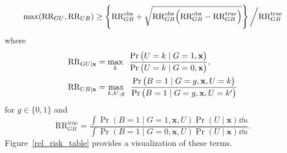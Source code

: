 \documentclass[aoas,preprint, 11pt, dvipsnames, table, x11name]{imsart}
\renewcommand{\bm}[1]{\mathbf{#1}}
\theoremstyle{remark}
\begin{document}
	\begin{equation}
		\max(\text{RR}_{GU}, \text{RR}_{UB})\geq \cbr{\text{RR}^{\text{obs}}_{GB}+\sqrt{\text{RR}^{\text{obs}}_{GB}\qty(\text{RR}^{\text{obs}}_{GB}-\text{RR}^{\text{true}}_{GB})}}\bigg{/}\text{RR}^{\text{true}}_{GB}
		\label{high_thresh}
	\end{equation}
	where
	\begin{align*}
		\text{RR}_{GU\mid \bm{x}} &= \max_{k} \;\;  \frac{\Pr\qty(U=k\mid G=1, \bm{x})}{\Pr\qty(U=k\mid G=0, \bm{x})},\\
		\text{RR}_{UB\mid \bm{x}} &= \max_{k,k',g} \;\; \frac{\Pr\qty(B=1\mid G=g, \bm{x}, U=k)}{\Pr\qty(B=1\mid G=g, \bm{x}, U=k')} 
	\end{align*}
	for $g \in \lbrace 0,1\rbrace$ and
	\begin{equation}
		\text{RR}^{\text{true}}_{GB}=\frac{\int \Pr(B=1\mid G=1, \bm{x}, U)\Pr(U\mid \bm{x})\dd u}{\int \Pr(B=1\mid G=0, \bm{x}, U)\Pr(U\mid \bm{x})\dd u}.
		\label{true_causal_rr}
	\end{equation} 
	Figure~\ref{rel_risk_table} provides a visualization of these terms.
	
\end{document}
